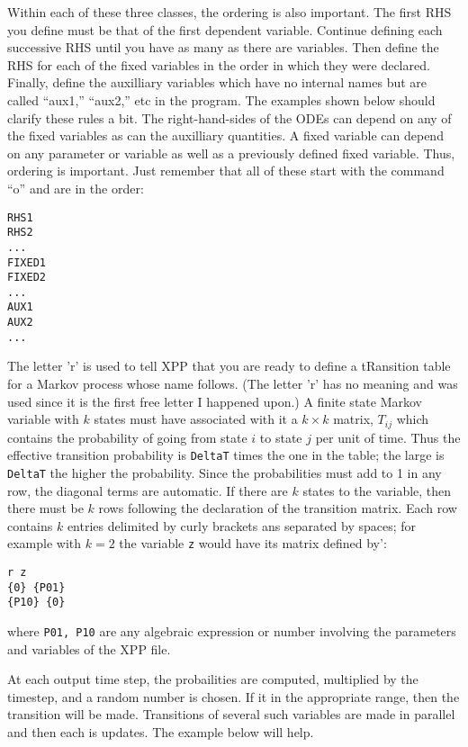 Within each of these three classes, the ordering is also important.
The first RHS you define must be that of the first dependent
variable.  Continue defining each successive RHS until you have as
many as there are variables. Then define the RHS for each of the fixed
variables in the order in which they were declared.  Finally, define
the auxilliary variables which have no internal names but are called
``aux1,'' ``aux2,'' etc in the program.  The examples shown below
should clarify these rules a bit.  The right-hand-sides of the ODEs
can depend on any of the fixed variables as can the auxilliary
quantities.  A fixed variable can depend on any parameter or variable
as well as a previously defined fixed variable.  Thus, ordering is
important.   Just remember that all of these start with the command
``o'' and are in the order:
\begin{verbatim}
RHS1
RHS2
...
FIXED1
FIXED2
...
AUX1
AUX2
...
\end{verbatim}   

\medskip


The letter 'r' is used to tell XPP that you are ready to define a
tRansition table for a Markov process whose name follows.
 (The letter 'r' has no meaning
and was used since it is the first free letter I happened upon.) A
finite state Markov variable with $k$ states must have associated with
it a $k\times k$ matrix, $T_{ij}$ which contains the probability of going from
state $i$ to state $j$ per unit of time.  Thus the effective
transition probability is {\tt DeltaT} times the one in the table; the
large is {\tt DeltaT} the higher the probability.  Since the
probabilities must add to 1 in any row, the diagonal terms are
automatic. If there are $k$ states to the variable, then there must be
$k$ rows following the declaration of the transition matrix.  Each row
contains $k$ entries delimited by curly brackets ans separated by
spaces; for example with $k=2$ the variable {\tt z} would have its
matrix defined by':
\begin{verbatim}
r z
{0} {P01}
{P10} {0}
\end{verbatim}
where {\tt P01, P10} are any algebraic expression or number involving
the parameters and variables of the XPP file.

At each output time step, the probailities are computed, multiplied by
the timestep, and a random number is chosen.  If it in the appropriate
range, then the transition will be made.  Transitions of several such
variables are made in parallel and then each is updates. The example
below will help. 

